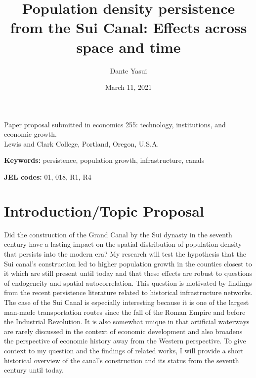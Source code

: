 \documentclass[11pt]{article}
\begin{document}
\title{Population density persistence from the Sui Canal: Effects across space and time}
\author{Dante Yasui}
\date{March 11, 2021}
\maketitle

\begin{center}
\footnotesize{Paper proposal submitted in economics 255: technology, institutions, and economic growth. \\ Lewis and Clark College, Portland, Oregon, U.S.A.}
\end{center}

\strut
\textbf{Keywords:} persistence, population growth, infrastructure, canals

\textbf{JEL codes:} 01, 018, R1, R4

\section{Introduction/Topic Proposal}

Did the construction of the Grand Canal by the Sui dynasty in the seventh century have a lasting impact on the spatial distribution of population density that persists into the modern era? My research will test the hypothesis that the Sui canal’s construction led to higher population growth in the counties closest to it which are still present until today and that these effects are robust to questions of endogeneity and spatial autocorrelation.
This question is motivated by findings from the recent persistence literature related to historical infrastructure networks. The case of the Sui Canal is especially interesting because it is one of the largest man-made transportation routes since the fall of the Roman Empire and before the Industrial Revolution. It is also somewhat unique in that artificial waterways are rarely discussed in the context of economic development and also broadens the perspective of economic history away from the Western perspective. To give context to my question and the findings of related works, I will provide a short historical overview of the canal’s construction and its status from the seventh century until today. 
\end{document}
